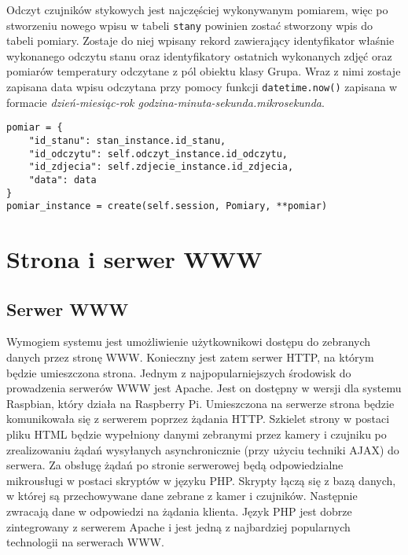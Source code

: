 \documentclass[a4paper,12pt,twoside]{article}
\begin{document}
Odczyt czujników stykowych jest najczęściej wykonywanym pomiarem, więc po stworzeniu nowego wpisu w tabeli \texttt{stany} powinien zostać stworzony wpis do tabeli pomiary. Zostaje do niej wpisany rekord zawierający identyfikator właśnie wykonanego odczytu stanu oraz identyfikatory ostatnich wykonanych zdjęć oraz pomiarów temperatury odczytane z pól obiektu klasy Grupa. Wraz z nimi zostaje zapisana data wpisu odczytana przy pomocy funkcji \texttt{datetime.now()} zapisana w formacie \textit{dzień-miesiąc-rok godzina-minuta-sekunda.mikrosekunda}.
\begin{lstlisting}
pomiar = {
	"id_stanu": stan_instance.id_stanu,
	"id_odczytu": self.odczyt_instance.id_odczytu,
	"id_zdjecia": self.zdjecie_instance.id_zdjecia,
	"data": data
}
pomiar_instance = create(self.session, Pomiary, **pomiar)
\end{lstlisting}

\newpage

\section{Strona i serwer WWW}

\subsection{Serwer WWW}
Wymogiem systemu jest umożliwienie użytkownikowi dostępu do zebranych danych przez stronę WWW. Konieczny jest zatem serwer HTTP, na którym będzie umieszczona strona. Jednym z najpopularniejszych środowisk do prowadzenia serwerów WWW jest Apache. Jest on dostępny w wersji dla systemu Raspbian, który działa na Raspberry Pi. Umieszczona na serwerze strona będzie komunikowała się z serwerem poprzez żądania HTTP. Szkielet strony w postaci pliku HTML będzie wypełniony danymi zebranymi przez kamery i czujniku po zrealizowaniu żądań wysyłanych asynchronicznie (przy użyciu techniki AJAX) do serwera. Za obsługę żądań po stronie serwerowej będą odpowiedzialne mikrousługi w postaci skryptów w języku PHP. Skrypty łączą się z bazą danych, w której są przechowywane dane zebrane z kamer i czujników. Następnie zwracają dane w odpowiedzi na żądania klienta. Język PHP jest dobrze zintegrowany z serwerem Apache i jest jedną z najbardziej popularnych technologii na serwerach WWW.
\end{document}
